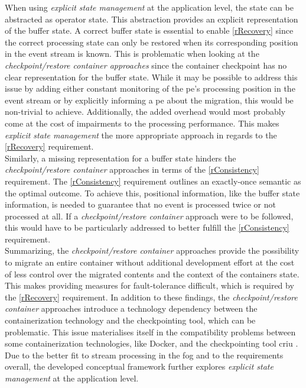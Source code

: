 When using \textit{explicit state management} at the application level, the state can be abstracted as operator state. This abstraction provides an explicit representation of the buffer state. A correct buffer state is essential to enable \ref{rRecovery} since the correct processing state can only be restored when its corresponding position in the event stream is known. This is problematic when looking at the \textit{checkpoint/restore container approaches} since the container checkpoint has no clear representation for the buffer state. While it may be possible to address this issue by adding either constant monitoring of the \gls{pe}'s processing position in the event stream or by explicitly informing a \gls{pe} about the migration, this would be non-trivial to achieve. Additionally, the added overhead would most probably come at the cost of impairments to the processing performance. This makes \textit{explicit state management} the more appropriate approach in regards to the \ref{rRecovery} requirement.\\
Similarly, a missing representation for a buffer state hinders the \textit{checkpoint/restore container} approaches in terms of the \ref{rConsistency} requirement. The \ref{rConsistency} requirement outlines an exactly-once semantic as the optimal outcome. To achieve this, positional information, like the buffer state information, is needed to guarantee that no event is processed twice or not processed at all. If a \textit{checkpoint/restore container} approach were to be followed, this would have to be particularly addressed to better fulfill the \ref{rConsistency} requirement.\\
Summarizing, the \textit{checkpoint/restore container} approaches provide the possibility to migrate an entire container without additional development effort at the cost of less control over the migrated contents and the context of the containers state. This makes providing measures for fault-tolerance difficult, which is required by the \ref{rRecovery} requirement. In addition to these findings, the \textit{checkpoint/restore container} approaches introduce a technology dependency between the containerization technology and the checkpointing tool, which can be problematic. This issue materialises itself in the compatibility problems between some containerization technologies, like Docker, and the checkpointing tool \gls{criu} \cite{Brogi.2018, .27032020}.\\
Due to the better fit to stream processing in the fog and to the requirements overall, the developed conceptual framework further explores \textit{explicit state management} at the application level.\par


